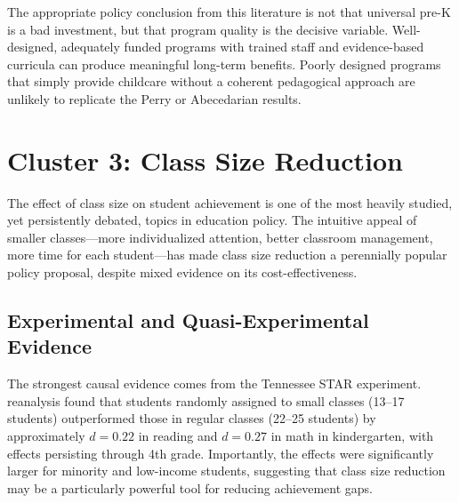 \documentclass[12pt,letterpaper]{article}
\begin{document}
The appropriate policy conclusion from this literature is not that universal pre-K is a bad investment, but that program quality is the decisive variable. Well-designed, adequately funded programs with trained staff and evidence-based curricula can produce meaningful long-term benefits. Poorly designed programs that simply provide childcare without a coherent pedagogical approach are unlikely to replicate the Perry or Abecedarian results.

\section{Cluster 3: Class Size Reduction}

The effect of class size on student achievement is one of the most heavily studied, yet persistently debated, topics in education policy. The intuitive appeal of smaller classes---more individualized attention, better classroom management, more time for each student---has made class size reduction a perennially popular policy proposal, despite mixed evidence on its cost-effectiveness.

\subsection{Experimental and Quasi-Experimental Evidence}

The strongest causal evidence comes from the Tennessee STAR experiment. \citet{krueger1999} reanalysis found that students randomly assigned to small classes (13--17 students) outperformed those in regular classes (22--25 students) by approximately $d = 0.22$ in reading and $d = 0.27$ in math in kindergarten, with effects persisting through 4th grade. Importantly, the effects were significantly larger for minority and low-income students, suggesting that class size reduction may be a particularly powerful tool for reducing achievement gaps.
\end{document}
